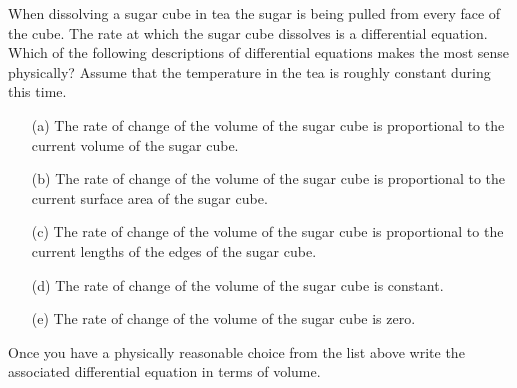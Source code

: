 \begin{problem}\label{prob:sugar_cube_1}
    When dissolving a sugar cube in tea the sugar is being pulled from every face of the
    cube.  The rate at which the sugar cube dissolves is a differential equation.  Which
    of the following descriptions of differential equations makes the most sense
    physically?  Assume that the temperature in the tea is roughly constant during this time.
    \begin{enumerate}
        \item[(a)] The rate of change of the volume of the sugar cube is proportional to
            the current volume of the sugar cube.
        \item[(b)] The rate of change of the volume of the sugar cube is proportional to
            the current surface area of the sugar cube.
        \item[(c)] The rate of change of the volume of the sugar cube is proportional to
            the current lengths of the edges of the sugar cube.
        \item[(d)] The rate of change of the volume of the sugar cube is constant.
        \item[(e)] The rate of change of the volume of the sugar cube is zero.
    \end{enumerate}
    Once you have a physically reasonable choice from the list above write the associated
    differential equation in terms of volume.  
\end{problem}


